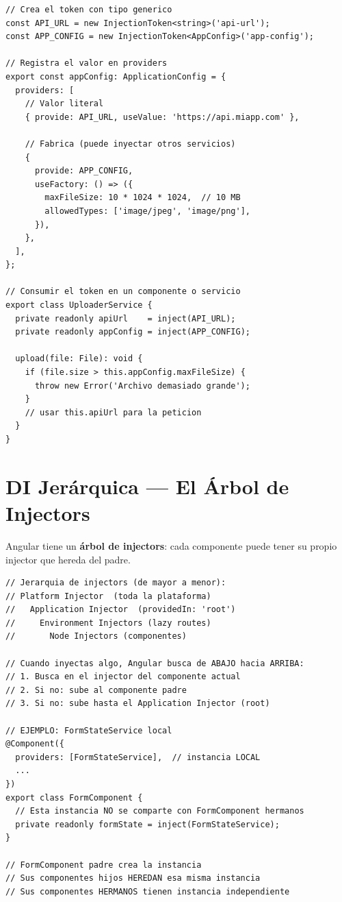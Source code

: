 \documentclass[12pt, a4paper]{article}
\begin{document}
\begin{lstlisting}
// Crea el token con tipo generico
const API_URL = new InjectionToken<string>('api-url');
const APP_CONFIG = new InjectionToken<AppConfig>('app-config');

// Registra el valor en providers
export const appConfig: ApplicationConfig = {
  providers: [
    // Valor literal
    { provide: API_URL, useValue: 'https://api.miapp.com' },

    // Fabrica (puede inyectar otros servicios)
    {
      provide: APP_CONFIG,
      useFactory: () => ({
        maxFileSize: 10 * 1024 * 1024,  // 10 MB
        allowedTypes: ['image/jpeg', 'image/png'],
      }),
    },
  ],
};

// Consumir el token en un componente o servicio
export class UploaderService {
  private readonly apiUrl    = inject(API_URL);
  private readonly appConfig = inject(APP_CONFIG);

  upload(file: File): void {
    if (file.size > this.appConfig.maxFileSize) {
      throw new Error('Archivo demasiado grande');
    }
    // usar this.apiUrl para la peticion
  }
}
\end{lstlisting}

\section{  DI Jerárquica --- El Árbol de Injectors}

Angular tiene un \textbf{árbol de injectors}: cada componente puede tener su propio injector
que hereda del padre.

\begin{lstlisting}
// Jerarquia de injectors (de mayor a menor):
// Platform Injector  (toda la plataforma)
//   Application Injector  (providedIn: 'root')
//     Environment Injectors (lazy routes)
//       Node Injectors (componentes)

// Cuando inyectas algo, Angular busca de ABAJO hacia ARRIBA:
// 1. Busca en el injector del componente actual
// 2. Si no: sube al componente padre
// 3. Si no: sube hasta el Application Injector (root)

// EJEMPLO: FormStateService local
@Component({
  providers: [FormStateService],  // instancia LOCAL
  ...
})
export class FormComponent {
  // Esta instancia NO se comparte con FormComponent hermanos
  private readonly formState = inject(FormStateService);
}

// FormComponent padre crea la instancia
// Sus componentes hijos HEREDAN esa misma instancia
// Sus componentes HERMANOS tienen instancia independiente
\end{lstlisting}
\end{document}
